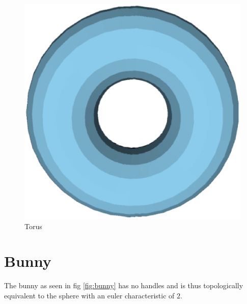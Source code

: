 \documentclass[a4paper,10pt,notitlepage]{scrreprt}
\begin{document}
\begin{figure}
  \centering

  \includegraphics[scale=0.5]{torus.eps}

  \caption{Torus}
  \label{fig:torus}
\end{figure}

\section{Bunny}

The bunny as seen in fig \ref{fig:bunny} has no handles and is thus
topologically equivalent to the sphere with an euler characteristic of $2$.
\end{document}
